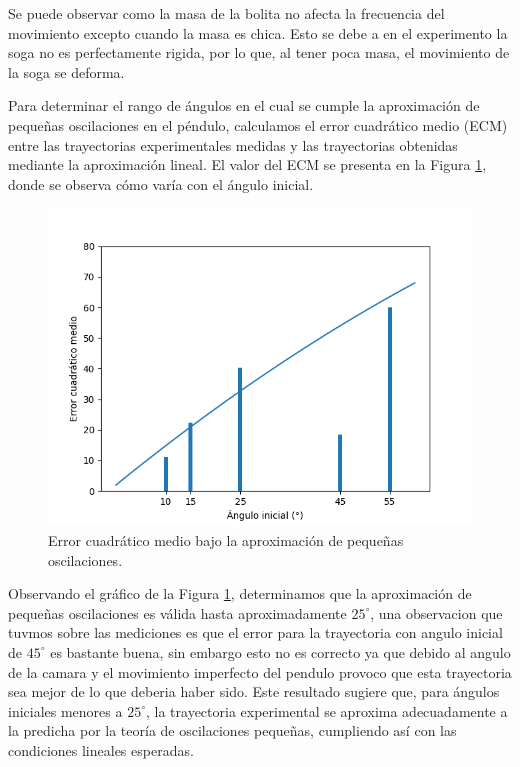 \documentclass[12pt,a4]{article}
\begin{document}
Se puede observar como la masa de la bolita no afecta la frecuencia del movimiento excepto cuando la masa es chica. Esto se debe a en el experimento la soga no es perfectamente rigida, por lo que, al tener poca masa, el movimiento de la soga se deforma.

Para determinar el rango de ángulos en el cual se cumple la aproximación de pequeñas oscilaciones en el péndulo, calculamos el error cuadrático medio (ECM) entre las trayectorias experimentales medidas y las trayectorias obtenidas mediante la aproximación lineal. El valor del ECM se presenta en la Figura \ref{fig:pequeñas_oscilaciones}, donde se observa cómo varía con el ángulo inicial.

\begin{figure}[H]
    \centering
    \includegraphics[width=0.6\linewidth]{peq_oscilaciones.png}
    \caption{Error cuadrático medio bajo la aproximación de pequeñas oscilaciones.}
    \label{fig:pequeñas_oscilaciones}
\end{figure}

Observando el gráfico de la Figura \ref{fig:pequeñas_oscilaciones}, determinamos que la aproximación de pequeñas oscilaciones es válida hasta aproximadamente $25^\circ$, una observacion que tuvmos sobre las mediciones es que el error para la trayectoria con angulo inicial de $45^\circ$ es bastante buena, sin embargo esto no es correcto ya que debido al angulo de la camara y el movimiento imperfecto del pendulo provoco que esta trayectoria sea mejor de lo que deberia haber sido. Este resultado sugiere que, para ángulos iniciales menores a $25^\circ$, la trayectoria experimental se aproxima adecuadamente a la predicha por la teoría de oscilaciones pequeñas, cumpliendo así con las condiciones lineales esperadas.
\end{document}
